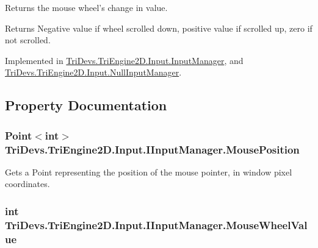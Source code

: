 Returns the mouse wheel's change in value. 

\begin{DoxyReturn}{Returns}
Negative value if wheel scrolled down, positive value if scrolled up, zero if not scrolled.
\end{DoxyReturn}


Implemented in \hyperlink{class_tri_devs_1_1_tri_engine2_d_1_1_input_1_1_input_manager_af8aa353e5d9434776181a42312c1499b}{Tri\-Devs.\-Tri\-Engine2\-D.\-Input.\-Input\-Manager}, and \hyperlink{class_tri_devs_1_1_tri_engine2_d_1_1_input_1_1_null_input_manager_a48b6584ca2a845d0ae108a0e08145c43}{Tri\-Devs.\-Tri\-Engine2\-D.\-Input.\-Null\-Input\-Manager}.



\subsection{Property Documentation}
\hypertarget{interface_tri_devs_1_1_tri_engine2_d_1_1_input_1_1_i_input_manager_a1c7099f4027c14a36873ca2809ecdb62}{
\subsubsection[{Mouse\-Position}]{\setlength{\rightskip}{0pt plus 5cm}Point$<$int$>$ Tri\-Devs.\-Tri\-Engine2\-D.\-Input.\-I\-Input\-Manager.\-Mouse\-Position\hspace{0.3cm}{\ttfamily [get]}}}\label{interface_tri_devs_1_1_tri_engine2_d_1_1_input_1_1_i_input_manager_a1c7099f4027c14a36873ca2809ecdb62}


Gets a Point representing the position of the mouse pointer, in window pixel coordinates. 

\hypertarget{interface_tri_devs_1_1_tri_engine2_d_1_1_input_1_1_i_input_manager_a7d42befc637abbaf51f46ba93d12aff8}{
\subsubsection[{Mouse\-Wheel\-Value}]{\setlength{\rightskip}{0pt plus 5cm}int Tri\-Devs.\-Tri\-Engine2\-D.\-Input.\-I\-Input\-Manager.\-Mouse\-Wheel\-Value\hspace{0.3cm}{\ttfamily [get]}}}\label{interface_tri_devs_1_1_tri_engine2_d_1_1_input_1_1_i_input_manager_a7d42befc637abbaf51f46ba93d12aff8}


